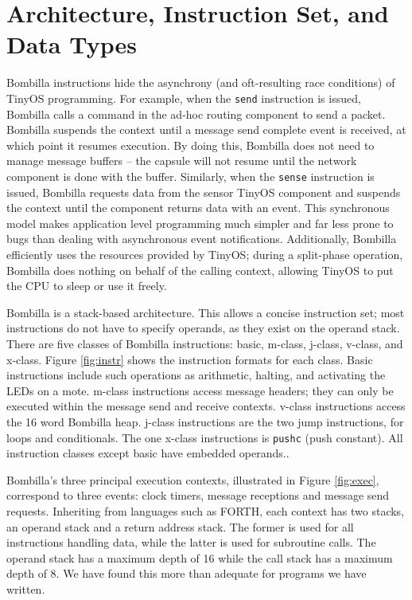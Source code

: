 \documentclass[10pt]{article}
\begin{document}
\section{Architecture, Instruction Set, and Data Types}

Bombilla instructions hide the asynchrony (and oft-resulting race
conditions) of TinyOS programming. For example, when the {\tt send}
instruction is issued, Bombilla calls a command in the ad-hoc routing
component to send a packet. Bombilla suspends the context until a
message send complete event is received, at which point it resumes
execution. By doing this, Bombilla does not need to manage message
buffers -- the capsule will not resume until the network component is
done with the buffer. Similarly, when the {\tt sense} instruction is
issued, Bombilla requests data from the sensor TinyOS component and
suspends the context until the component returns data with an
event. This synchronous model makes application level programming much
simpler and far less prone to bugs than dealing with asynchronous
event notifications. Additionally, Bombilla efficiently uses the
resources provided by TinyOS; during a split-phase operation, Bombilla
does nothing on behalf of the calling context, allowing TinyOS to put
the CPU to sleep or use it freely.

Bombilla is a stack-based architecture. This allows a concise
instruction set; most instructions do not have to specify operands, as
they exist on the operand stack. There are five classes of Bombilla
instructions: basic, m-class, j-class, v-class, and x-class. Figure
\ref{fig:instr} shows the instruction formats for each class. Basic
instructions include such operations as arithmetic, halting, and
activating the LEDs on a mote. m-class instructions access message
headers; they can only be executed within the message send and receive
contexts. v-class instructions access the 16 word Bombilla
heap. j-class instructions are the two jump instructions, for loops
and conditionals. The one x-class instructions is {\tt pushc} (push
constant). All instruction classes except basic have embedded operands..

Bombilla's three principal execution contexts, illustrated in Figure
\ref{fig:exec}, correspond to three events: clock timers, message
receptions and message send requests.  Inheriting from languages such
as FORTH, each context has two stacks, an operand stack and a return
address stack. The former is used for all instructions handling data,
while the latter is used for subroutine calls. The operand stack has a
maximum depth of 16 while the call stack has a maximum depth of 8. We
have found this more than adequate for programs we have written.
\end{document}
